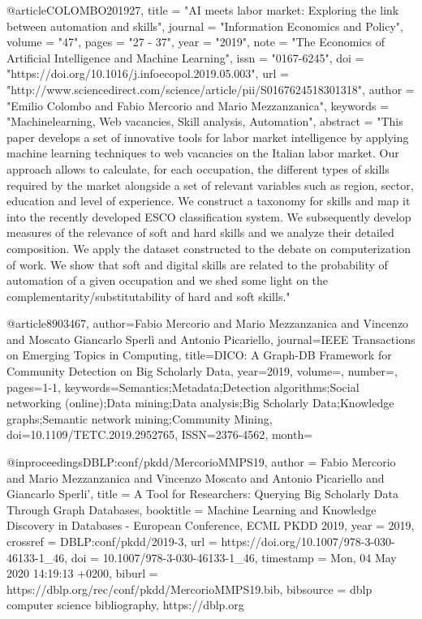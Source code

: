 {@article{COLOMBO201927,
title = "AI meets labor market: Exploring the link between automation and skills",
journal = "Information Economics and Policy",
volume = "47",
pages = "27 - 37",
year = "2019",
note = "The Economics of Artificial Intelligence and Machine Learning",
issn = "0167-6245",
doi = "https://doi.org/10.1016/j.infoecopol.2019.05.003",
url = "http://www.sciencedirect.com/science/article/pii/S0167624518301318",
author = "Emilio Colombo and Fabio Mercorio and Mario Mezzanzanica",
keywords = "Machinelearning, Web vacancies, Skill analysis, Automation",
abstract = "This paper develops a set of innovative tools for labor market intelligence by applying machine learning techniques to web vacancies on the Italian labor market. Our approach allows to calculate, for each occupation, the different types of skills required by the market alongside a set of relevant variables such as region, sector, education and level of experience. We construct a taxonomy for skills and map it into the recently developed ESCO classification system. We subsequently develop measures of the relevance of soft and hard skills and we analyze their detailed composition. We apply the dataset constructed to the debate on computerization of work. We show that soft and digital skills are related to the probability of automation of a given occupation and we shed some light on the complementarity/substitutability of hard and soft skills."
}

@article{8903467,
author={Fabio Mercorio and Mario Mezzanzanica and Vincenzo and Moscato Giancarlo Sperlì and Antonio Picariello},
journal={IEEE Transactions on Emerging Topics in Computing},
title={DICO: A Graph-DB Framework for Community Detection on Big Scholarly Data},
year={2019},
volume={},
number={},
pages={1-1},
keywords={Semantics;Metadata;Detection algorithms;Social networking (online);Data mining;Data analysis;Big Scholarly Data;Knowledge graphs;Semantic network mining;Community Mining},
doi={10.1109/TETC.2019.2952765},
ISSN={2376-4562},
month={}
}

@inproceedings{DBLP:conf/pkdd/MercorioMMPS19,
  author    = {Fabio Mercorio and
               Mario Mezzanzanica and
               Vincenzo Moscato and
               Antonio Picariello and
               Giancarlo Sperli'},
  title     = {A Tool for Researchers: Querying Big Scholarly Data Through Graph
               Databases},
  booktitle = {Machine Learning and Knowledge Discovery in Databases - European Conference,
               {ECML} {PKDD} 2019},
  year      = {2019},
  crossref  = {DBLP:conf/pkdd/2019-3},
  url       = {https://doi.org/10.1007/978-3-030-46133-1\_46},
  doi       = {10.1007/978-3-030-46133-1\_46},
  timestamp = {Mon, 04 May 2020 14:19:13 +0200},
  biburl    = {https://dblp.org/rec/conf/pkdd/MercorioMMPS19.bib},
  bibsource = {dblp computer science bibliography, https://dblp.org}
}

}
